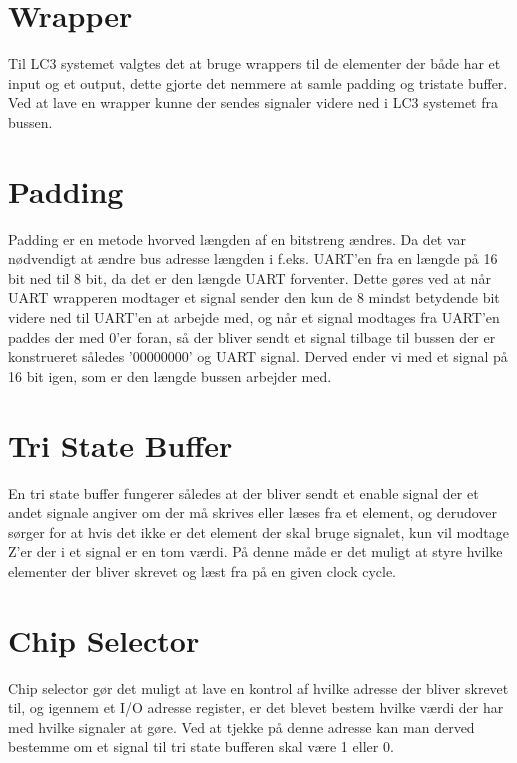 \section{Wrapper}
Til LC3 systemet valgtes det at bruge wrappers til de elementer der både har et input og et output, dette gjorte det nemmere at samle padding og tristate buffer. Ved at lave en wrapper kunne der sendes signaler videre ned i LC3 systemet fra bussen.

\section{Padding}
Padding er en metode hvorved længden af en bitstreng ændres. Da det var nødvendigt at ændre bus adresse længden i f.eks. UART'en fra en længde på 16 bit ned til 8 bit, da det er den længde UART forventer. Dette gøres ved at når UART wrapperen modtager et signal sender den kun de 8 mindst betydende bit videre ned til UART'en at arbejde med, og når et signal modtages fra UART'en paddes der med 0'er foran, så der bliver sendt et signal tilbage til bussen der er konstrueret således '00000000' og UART signal. Derved ender vi med et signal på 16 bit igen, som er den længde bussen arbejder med. 


\section{Tri State Buffer}
En tri state buffer fungerer således at der bliver sendt et enable signal der et andet signale angiver om der må skrives eller læses fra et element, og derudover sørger for at hvis det ikke er det element der skal bruge signalet, kun vil modtage Z'er der i et signal er en tom værdi. På denne måde er det muligt at styre hvilke elementer der bliver skrevet og læst fra på en given clock cycle. 


\section{Chip Selector}
Chip selector gør det muligt at lave en kontrol af hvilke adresse der bliver skrevet til, og igennem et I/O adresse register, er det blevet bestem hvilke værdi der har med hvilke signaler at gøre. Ved at tjekke på denne adresse kan man derved bestemme om et signal til tri state bufferen skal være 1 eller 0.
